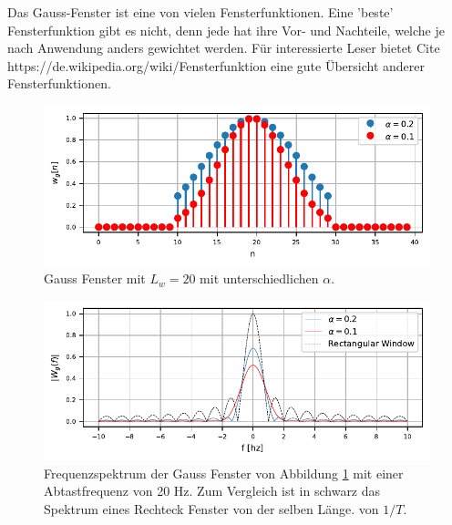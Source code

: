 Das Gauss-Fenster ist eine von vielen Fensterfunktionen. 
Eine 'beste' Fensterfunktion gibt es nicht, denn jede hat ihre Vor- und Nachteile, welche
je nach Anwendung anders gewichtet werden.
Für interessierte Leser bietet Cite https://de.wikipedia.org/wiki/Fensterfunktion eine 
gute Übersicht anderer Fensterfunktionen.
\begin{figure}
    \centering
    \includegraphics{papers/sonogramm/images/gauss_time.pdf}
    \caption{Gauss Fenster mit $L_w = 20$ mit unterschiedlichen $\alpha$.
    \label{sonogramm:gausstime}
    }
\end{figure}

\begin{figure}
    \centering
    \includegraphics{papers/sonogramm/images/gauss_freq.pdf}
    \caption{Frequenzspektrum der Gauss Fenster von Abbildung \ref{sonogramm:gausstime}
    mit einer Abtastfrequenz von 20 Hz. Zum Vergleich ist in schwarz das Spektrum eines Rechteck Fenster 
    von der selben Länge.
    von $1/T$.
    \label{sonogramm:gaussfreq}
    }
\end{figure}
